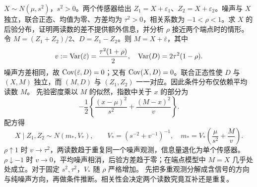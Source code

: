 $X\sim N(\mu,s^2)$，$s^2>0$。两个传感器给出 $Z_1=X+\varepsilon_1$、$Z_2=X+\varepsilon_2$。噪声与 $X$ 独立，联合正态、均值为零、方差均为 $\tau^2>0$，相关系数为 $-1<\rho<1$。求 $X$ 的后验分布，证明两读数的差不提供额外信息，并分析 $\rho$ 接近两个端点时的情形。
\solution 令 $M=(Z_1+Z_2)/2$、$D=Z_1-Z_2$。则 $M=X+\bar\varepsilon$，其中
\[
 v:=\operatorname{Var}(\bar\varepsilon)=\frac{\tau^2(1+\rho)}2,
 \quad \operatorname{Var}(D)=2\tau^2(1-\rho).
\]
噪声方差相同，故 $\operatorname{Cov}(\bar\varepsilon,D)=0$；又有 $\operatorname{Cov}(X,D)=0$。联合正态性使 $D$ 与 $(X,M)$ 独立，而 $(M,D)$ 与 $(Z_1,Z_2)$ 一一对应。因此条件分布仅依赖平均读数 $M$。
先验密度乘以 $M$ 的似然，指数中关于 $x$ 的部分为
\[
 -\frac12\left\{\frac{(x-\mu)^2}{s^2}
                  +\frac{(M-x)^2}{v}\right\}.
\]
配方得
\[
 X\mid Z_1,Z_2\sim N(m_*,V_*),\qquad
 V_*=(s^{-2}+v^{-1})^{-1},\quad
 m_*=V_*\left(\frac\mu{s^2}+\frac Mv\right).
\]
$\rho\uparrow1$ 时 $v\to\tau^2$，两读数趋于重复同一个噪声观测，信息量退化为单个传感器。$\rho\downarrow-1$ 时 $v\to0$，平均噪声相消，后验方差趋于零；在端点模型中 $M=X$ 几乎处处成立。对于固定 $s^2,\tau^2$，$V_*$ 随 $\rho$ 严格增加。
\insight 先把多重观测分解成含信号的方向与纯噪声方向，再做条件推断。相关性会决定两个读数究竟互补还是重复。
